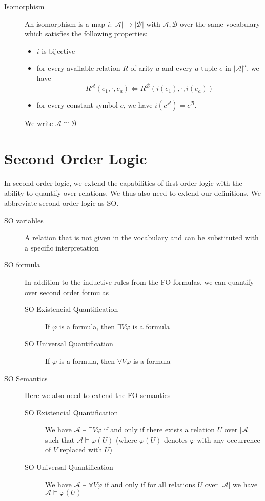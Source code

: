 \begin{description}
    \item[Isomorphism] An isomorphism is a map $i: |\mathcal{A}| \to |\mathcal{B}|$ with $\mathcal{A}, \mathcal{B}$ over the same vocabulary which satisfies the following properties:
    \begin{itemize}
        \setlength\itemsep{0.2em}
        \item $i$ is bijective
        \item for every available relation $R$ of arity $a$ and every $a$-tuple $\overline{e}$ in $|\mathcal{A}|^a$, we have \[R^{\mathcal{A}}(e_1, \cdot, e_a) \Leftrightarrow R^{\mathcal{B}}(i(e_1), \cdot, i(e_a))\]
        \item for every constant symbol $c$, we have $i(c^{\mathcal{A}}) = c^{\mathcal{B}}$.
    \end{itemize}
    We write $\mathcal{A} \cong \mathcal{B}$
\end{description}


\section{Second Order Logic}\label{sec:second-order-logic}
In second order logic, we extend the capabilities of first order logic with the ability to quantify over relations. We thus also need to extend our definitions. We abbreviate second order logic as SO\@.
\begin{description}
    \item[SO variables] A relation that is not given in the vocabulary and can be substituted with a specific interpretation
    \item[SO formula] In addition to the inductive rules from the FO formulas, we can quantify over second order formulas
    \begin{description}
        \item[SO Existencial Quantification] If $\varphi$ is a formula, then $\exists V\varphi$ is a formula
        \item[SO Universal Quantification] If $\varphi$ is a formula, then $\forall V\varphi$ is a formula
    \end{description}
    \item[SO Semantics] Here we also need to extend the FO semantics
    \begin{description}
        \item[SO Existencial Quantification]  We have $\mathcal{A} \models \exists V\varphi$ if and only if there exists a relation $U$ over $|\mathcal{A}|$ such that $\mathcal{A} \models \varphi(U)$ (where $\varphi(U)$ denotes $\varphi$ with any occurrence of $V$ replaced with $U$)
        \item[SO Universal Quantification] We have $\mathcal{A} \models \forall V\varphi$ if and only if for all relations $U$ over $|\mathcal{A}|$ we have $\mathcal{A} \models \varphi(U)$
    \end{description}
\end{description}


